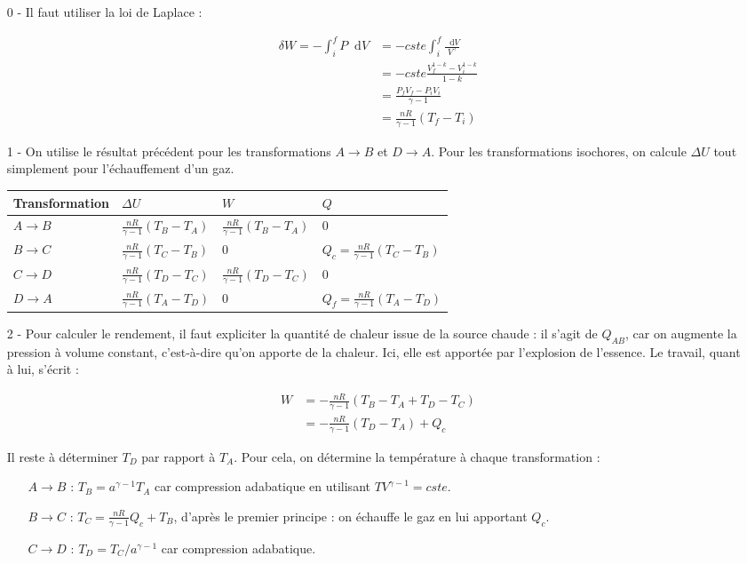 \documentclass{report}
\newcommand*\dif{\mathop{}\!\mathrm{d}}
\begin{document}
\begin{itemize}

	\item[0 -] Il faut utiliser la loi de Laplace : 

\begin{align*}
	\delta W = -\int_i^f P\dif V &= -cste\int_i^f \frac{\dif V}{V^{\gamma}}\\
	&=-cste\frac{V_f^{1-k}-V_i^{1-k}}{1-k}\\
	&=\frac{P_fV_f-P_iV_i}{\gamma-1}\\
	&= \frac{nR}{\gamma-1}(T_f-T_i)
\end{align*}

	\item[1 - ] On utilise le résultat précédent pour les transformations $A\rightarrow B$ et $D\rightarrow A$. Pour les transformations isochores, on calcule $\Delta U$ tout simplement pour l'échauffement d'un gaz.

\begin{center}
\begin{tabular}{|p{}|p{3cm}|p{3cm}|p{3cm}|}
\hline
Transformation & $\Delta U$ & $W$ & $Q$ \\
\hline
$A\rightarrow B$ & $\frac{nR}{\gamma-1}(T_B-T_A)$  & $\frac{nR}{\gamma-1}(T_B-T_A)$  & 0  \\
\hline
$B\rightarrow C$ & $\frac{nR}{\gamma-1}(T_C-T_B)$ & 0 & $Q_c=\frac{nR}{\gamma-1}(T_C-T_B)$  \\
\hline
$C\rightarrow D$ & $\frac{nR}{\gamma-1}(T_D-T_C)$  & $\frac{nR}{\gamma-1}(T_D-T_C)$ & 0 \\
\hline
$D\rightarrow A$ & $\frac{nR}{\gamma-1}(T_A-T_D)$ & 0 & $Q_f=\frac{nR}{\gamma-1}(T_A-T_D)$ \\
\hline
\end{tabular}
\end{center}

\item[2 -] Pour calculer le rendement, il faut expliciter la quantité de chaleur issue de la source chaude : il s'agit de $Q_{AB}$, car on augmente la pression à volume constant, c'est-à-dire qu'on apporte de la chaleur. Ici, elle est apportée par l'explosion de l'essence. Le travail, quant à lui, s'écrit :

\begin{align*}
	W &= -\frac{nR}{\gamma-1}(T_B-T_A+T_D-T_C)\\
	&=-\frac{nR}{\gamma-1}(T_D-T_A) + Q_c
\end{align*}

Il reste à déterminer $T_D$ par rapport à $T_A$. Pour cela, on détermine la température à chaque transformation :
\begin{itemize}
	\item[$A\rightarrow B$ :] $T_B=a^{\gamma-1}T_A$ car compression adabatique en utilisant $TV^{\gamma-1}=cste$.
	\item[$B\rightarrow C$ :] $T_C=\frac{nR}{\gamma-1}Q_c + T_B$, d'après le premier principe : on échauffe le gaz en lui apportant $Q_c$.
	\item[$C\rightarrow D$ :] $T_D=T_C/a^{\gamma-1}$ car compression adabatique.
\end{itemize}


\end{itemize}
\end{document}
